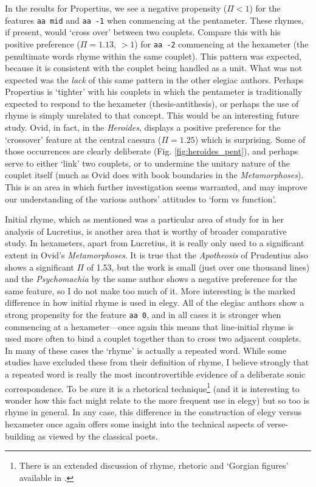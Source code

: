 \documentclass[twocolumn, switch]{article} %
\begin{document}
In the results for Propertius, we see a negative propensity ($\Pi < 1$) for
the features \texttt{aa mid} and \texttt{aa -1} when commencing at the
pentameter. These rhymes, if present, would `cross over' between two couplets.
Compare this with his positive preference ($\Pi = 1.13$, $> 1$) for \texttt{aa
-2} commencing at the hexameter (the penultimate words rhyme within the same
couplet). This pattern was expected, because it is consistent with the couplet
being handled as a unit. What was not expected was the \emph{lack} of this
same pattern in the other elegiac authors. Perhaps Propertius is `tighter'
with his couplets in which the pentameter is traditionally expected to respond
to the hexameter (thesis-antithesis), or perhaps the use of rhyme is simply
unrelated to that concept. This would be an interesting future study. Ovid, in
fact, in the \emph{Heroides}, displays a positive preference for the
`crossover' feature at the central caesura ($\Pi=1.25$) which is surprising.
Some of those occurrences are clearly deliberate (Fig.
\ref{fig:heroides_pent}), and perhaps serve to either `link' two couplets, or
to undermine the unitary nature of the couplet itself (much as Ovid does with
book boundaries in the \emph{Metamorphoses}). This is an area in which further
investigation seems warranted, and may improve our understanding of the
various authors' attitudes to `form vs function'.

Initial rhyme, which as mentioned was a particular area of study for
\citeauthor{deutsch_1978} in her analysis of Lucretius, is another area that
is worthy of broader comparative study. In hexameters, apart from Lucretius,
it is really only used to a significant extent in Ovid's \emph{Metamorphoses}.
It is true that the \emph{Apotheosis} of Prudentius also shows a significant
$\Pi$ of 1.53, but the work is small (just over one thousand lines) and the
\emph{Psychomachia} by the same author shows a negative preference for the
same feature, so I do not make too much of it. More interesting is the marked
difference in how initial rhyme is used in elegy. All of the elegiac authors
show a strong propensity for the feature \texttt{aa 0}, and in all cases it is
stronger when commencing at a hexameter---once again this means that
line-initial rhyme is used more often to bind a couplet together than to cross
two adjacent couplets. In many of these cases the `rhyme' is actually a
repeated word. While some studies have excluded these from their definition of
rhyme, I believe strongly that a repeated word is really the most
incontrovertible evidence of a deliberate sonic correspondence. To be sure it
is a rhetorical technique\footnote{
  There is an extended discussion of rhyme, rhetoric and `Gorgian figures'
  available in .
}
(and it is interesting to wonder how this fact might relate to the more
frequent use in elegy) but so too is rhyme in general. In any case, this
difference in the construction of elegy versus hexameter once again offers
some insight into the technical aspects of verse-building as viewed by the
classical poets.
\end{document}
